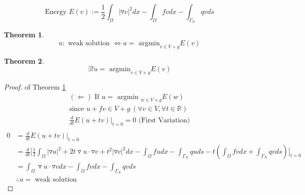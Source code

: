 \documentclass[a4paper,12pt]{article}
\newtheorem{theorem}{Theorem}
\newcommand{\R}{\mathbb{R}}
\begin{document}
\begin{equation}\nonumber
\text{Energy } E(v) := \frac{1}{2} \int_\Omega |\triangledown v|^2 dx - \int_\Omega fv dx - \int_{\Gamma_N} qv ds
\end{equation}
\begin{theorem}\label{theorem1}
	\begin{equation}\nonumber
	u: \text{ weak solution } \Leftrightarrow u= \text{ argmin}_{v\in V+g} E(v)
	\end{equation}
\end{theorem}
\begin{theorem}\label{theorem2}
	\begin{equation}\nonumber
	\exists! u = \text{ argmin}_{v\in V+g} E(v)
	\end{equation}
\end{theorem}
\begin{proof}of Theorem \ref{theorem1}
	\begin{equation}\nonumber
	\begin{aligned}
		(\Leftarrow) \text{ If } u = \text{ argmin }_{w\in V+g} E(w)\\
		\text{since } u+fv \in V+g\ (\forall v \in V, \forall t\in \R)\\
		\frac{d}{dt} E(u+tv)|_{t=0} = 0 \text{ (First Variation)}\\
	\end{aligned}
	\end{equation}
	\begin{equation}\nonumber
	\begin{aligned}
	0 &= \frac{d}{dt} E(u+tv)|_{t=0}\\
	&= \frac{d}{dt}\bigg[ \frac{1}{2} \int_\Omega |\triangledown u|^2 + 2t \triangledown u \cdot \triangledown v + t^2 |\triangledown v|^2 dx - \int_\Omega fu dx -\int_{\Gamma_N} qu ds - t(\int_\Omega fv dx + \int_{\Gamma_N} qv ds) \bigg]_{t=0}\\
	&= \int_\Omega \triangledown u \cdot \triangledown v dx - \int_\Omega fv dx - \int_{\Gamma_N} qv ds\\
	&\therefore u=\text{ weak solution }
	\end{aligned}
	\end{equation}
\end{proof}
\end{document}
